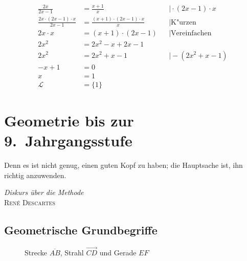 \begin{bsp}
 \begin{align*}
  \frac{2x}{2x-1} &= \frac{x+1}{x} &&\mid \cdot(2x-1) \cdot x\\
  \frac{2x\cdot (2x-1) \cdot x}{2x-1} &= \frac{(x+1)\cdot(2x-1)\cdot x}{x}&&\mid \text{K"urzen}\\
  2x\cdot x &= (x+1)\cdot (2x-1) &&\mid \text{Vereinfachen}\\
  2x^2 &= 2x^2 -x +2x -1 \\ 
  2x^2 &= 2x^2 +x -1 &&\mid -(2x^2+x-1) \\
  -x+1 &= 0 \\
  x &= 1 \\
  \mathcal{L}&= \lbrace 1\rbrace
 \end{align*}

\end{bsp}

\chapter{Geometrie bis zur 9.~Jahrgangsstufe}
\label{ch:geom}
\epigraph{Denn es ist nicht genug, einen guten Kopf zu haben; die Hauptsache ist, ihn richtig anzuwenden.}{\textit{Diskurs über die Methode}\\\textsc{René Descartes}}

\section{Geometrische Grundbegriffe}

\begin{figure}
 
  \begin{center}
               \end{center}
\caption{Strecke \(\overline{AB}\), Strahl \(\overrightarrow{CD}\) und Gerade \(EF\)}
\end{figure}

